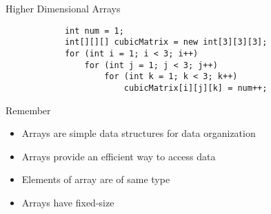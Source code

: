 \documentclass[10pt, compress]{beamer}
\begin{document}
\begin{slide}
	\begin{block}{Higher Dimensional Arrays}
		\begin{verbatim}
			int num = 1;
			int[][][] cubicMatrix = new int[3][3][3];
			for (int i = 1; i < 3; i++)
			    for (int j = 1; j < 3; j++)
			        for (int k = 1; k < 3; k++)
			            cubicMatrix[i][j][k] = num++;
		\end{verbatim}
	\end{block}
\end{slide}

\begin{slide}
	\begin{block}{Remember}
		\begin{itemize}
			\item[] Arrays are simple data structures for data organization
			\item[] Arrays provide an efficient way to access data
			\item[] Elements of array are of same type
			\item[] Arrays have fixed-size
		\end{itemize}
	\end{block}
\end{slide}

\end{document}
